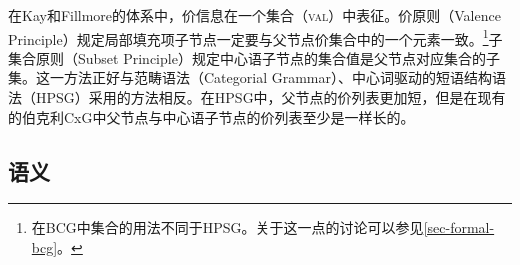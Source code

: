 在Kay和Fillmore的体系中，价信息在一个集合（\textsc{val}）中表征。价原则（Valence Principle）规定局部填充项子节点一定要与父节点价集合中的一个元素一致。\footnote{%
  在BCG中集合的用法不同于HPSG。关于这一点的讨论可以参见\ref{sec-formal-bcg}。%
}子集合原则（Subset Principle）规定中心语子节点的集合值是父节点对应集合的子集。这一方法正好与范畴语法\indexcgc（Categorial Grammar）、中心词驱动的短语结构语法\indexhpsgc（HPSG）采用的方法相反。在HPSG中，父节点的价列表更加短，但是在现有的伯克利CxG中父节点与中心语子节点的价列表至少是一样长的。

\subsection{语义}


